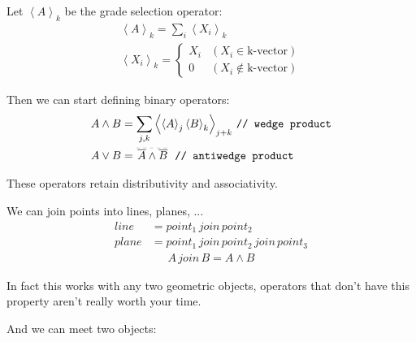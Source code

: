 \documentclass[twoside]{article}
\newcommand{\M}[1]{\scriptstyle{#1}} %
\newcommand{\T}[1]{\textrm{#1}} %
\newcommand{\join}{{\,\M{join}\,}}
\newcommand{\braket}[1]{\left\langle{#1}\right\rangle}
\newcommand{\aside}[1]{\begin{flushright}\scriptsize{#1}\end{flushright}}
\newcommand{\boxedmath}[1]{\begin{center}\boxed{$$#1$$}\end{center}
    }
\newcommand{\overdash}[1]{%
        \tikz[baseline=(todotted.base)]{
            \node[inner sep=1pt,outer sep=0pt] (todotted) {$#1$};
            \draw[dashed, line width=0.05mm] (todotted.north west) -- (todotted.north east);
        }%
    }
\begin{document}
\begin{multicols*}{2}
            \par
                Let $ \braket{A}_k $ be the grade selection operator:
                \begin{gather*}
                    \braket{A}_k = \sum_i \braket{X_i}_k \\
                    \braket{X_i}_k = \begin{cases}
                        X_i & (X_i \in \T{k-vector}) \\
                        0 & (X_i \notin \T{k-vector})
                    \end{cases}
                \end{gather*}
            \par
                Then we can start defining binary operators:
                $$\begin{aligned}
                    A \wedge B &= \sum_{j,k} \braket{\braket{A}_j \braket{B}_k}_{j+k} \, \texttt{// wedge product} \\
                    A \vee B &= \overdash{\overline{A} \wedge \overline{B}} \texttt{ // antiwedge product}
                \end{aligned}$$
                \aside{These operators retain distributivity and associativity.}
            \par
                We can join points into lines, planes, ...
                \begin{align*}
                    line &= point_1 \join point_2 \\
                    plane &= point_1 \join point_2 \join point_3
                \end{align*} \vspace{-25px}
                \begin{align*}
                    A \join B = A \wedge B
                \end{align*}
                \boxedmath{\begin{aligned}
                    A \join B = A \vee B
                \end{aligned}}
                \aside{In fact this works with any two geometric objects, operators that don't have this property aren't really worth your time.}
            \par
                And we can meet two objects:
                \begin{align*}

\end{align*}
\end{multicols*}
\end{document}
